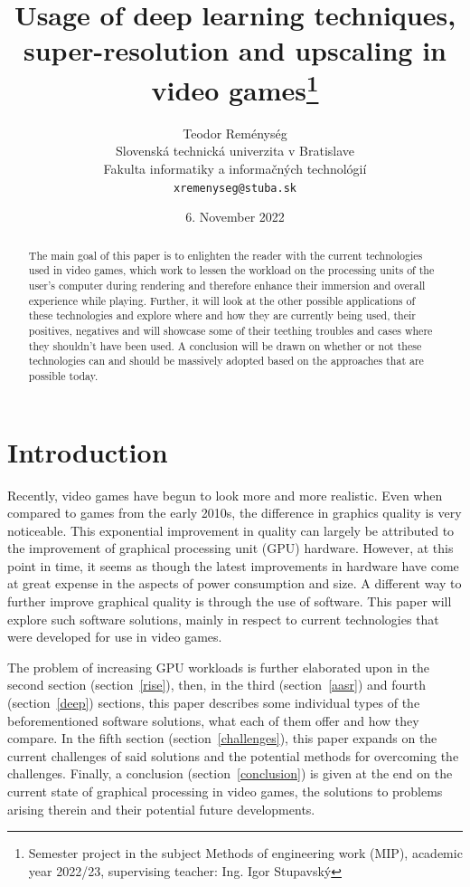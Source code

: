 \documentclass[10pt,twoside,english,a4paper]{article}
\title{Usage of deep learning techniques, super-resolution and upscaling in video games\thanks{Semester project in the subject Methods of engineering work (MIP), academic year 2022/23, supervising teacher: Ing. Igor Stupavský}}
\author{Teodor Reménység\\[2pt]
	{\small Slovenská technická univerzita v Bratislave}\\
	{\small Fakulta informatiky a informačných technológií}\\
	{\small \texttt{xremenyseg@stuba.sk}}
	}
\date{\small 6. November 2022}
\begin{document}
\maketitle

\begin{abstract}
The main goal of this paper is to enlighten the reader with the current technologies used in video games, which work to lessen the workload on the processing units of the user’s computer during rendering and therefore enhance their immersion and overall experience while playing. Further, it will look at the other possible applications of these technologies and explore where and how they are currently being used, their positives, negatives and will showcase some of their teething troubles and cases where they shouldn’t have been used. A conclusion will be drawn on whether or not these technologies can and should be massively adopted based on the approaches that are possible today.
\end{abstract}



\section{Introduction}

Recently, video games have begun to look more and more realistic. Even when compared to games from the early 2010s, the difference in graphics quality is very noticeable. This exponential improvement in quality can largely be attributed to the improvement of graphical processing unit (GPU) hardware. However, at this point in time, it seems as though the latest improvements in hardware have come at great expense in the aspects of power consumption and size. A different way to further improve graphical quality is through the use of software. This paper will explore such software solutions, mainly in respect to current technologies that were developed for use in video games.

The problem of increasing GPU workloads is further elaborated upon in the second section (section~\ref{rise}), then, in the third (section~\ref{aasr}) and fourth (section~\ref{deep}) sections, this paper describes some individual types of the beforementioned software solutions, what each of them offer and how they compare. In the fifth section (section~\ref{challenges}), this paper expands on the current challenges of said solutions and the potential methods for overcoming the challenges. Finally, a conclusion (section~\ref{conclusion}) is given at the end on the current state of graphical processing in video games, the solutions to problems arising therein and their potential future developments.
\end{document}
